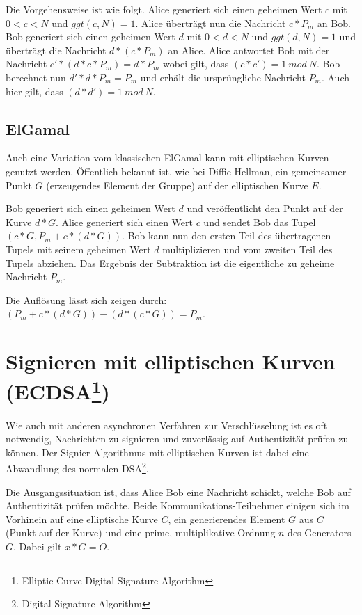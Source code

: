 Die Vorgehensweise ist wie folgt. Alice generiert sich einen geheimen Wert $c$ mit $0 < c < N$ und $ggt(c,N) = 1$.
Alice überträgt nun die Nachricht $c * P_m$ an Bob.
Bob generiert sich einen geheimen Wert $d$ mit $0 < d < N$ und $ggt(d,N) = 1$ und überträgt die Nachricht
$d * (c * P_m)$ an Alice.
Alice antwortet Bob mit der Nachricht $c' * (d * c * P_m) = d * P_m$ wobei gilt, dass $(c * c') = 1\ mod\ N$.
Bob berechnet nun $d' * d * P_m = P_m$ und erhält die ursprüngliche Nachricht $P_m$. Auch hier gilt, dass $(d * d') = 1\ mod\ N$.

\subsection{ElGamal}

Auch eine Variation vom klassischen ElGamal kann mit elliptischen Kurven genutzt werden.
Öffentlich bekannt ist, wie bei Diffie-Hellman, ein gemeinsamer Punkt $G$ (erzeugendes Element der Gruppe) auf der elliptischen Kurve $E$.

Bob generiert sich einen geheimen Wert $d$ und veröffentlicht den Punkt auf der Kurve $d * G$.
Alice generiert sich einen Wert $c$ und sendet Bob das Tupel $(c * G, P_m + c*(d*G))$. 
Bob kann nun den ersten Teil des übertragenen Tupels mit seinem geheimen Wert $d$ multiplizieren und vom zweiten Teil des Tupels abziehen.
Das Ergebnis der Subtraktion ist die eigentliche zu geheime Nachricht $P_m$.

Die Auflösung lässt sich zeigen durch: $(P_m + c * (d * G)) - (d * (c * G)) = P_m$.

\section{Signieren mit elliptischen Kurven (ECDSA\footnote{Elliptic Curve Digital Signature Algorithm})}

Wie auch mit anderen asynchronen Verfahren zur Verschlüsselung ist es oft notwendig, Nachrichten zu signieren und
zuverlässig auf Authentizität prüfen zu können.
Der Signier-Algorithmus mit elliptischen Kurven ist dabei eine Abwandlung des normalen DSA\footnote{Digital Signature Algorithm}.

Die Ausgangssituation ist, dass Alice Bob eine Nachricht schickt, welche Bob auf Authentizität prüfen möchte.
Beide Kommunikations-Teilnehmer einigen sich im Vorhinein auf eine elliptische Kurve $C$, ein generierendes Element $G$ aus $C$ 
(Punkt auf der Kurve) und eine prime, multiplikative Ordnung $n$ des Generators $G$. Dabei gilt $x * G = O$.


